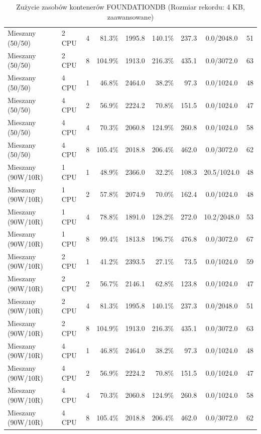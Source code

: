 \begin{table}[ht]
{\begin{tabular}{llcrrrrcc}
Mieszany (50/50) & 2 CPU & 4 & 81.3\% & 1995.8 & 140.1\% & 237.3 & 0.0/2048.0 & 51 \\
Mieszany (50/50) & 2 CPU & 8 & 104.9\% & 1913.0 & 216.3\% & 435.1 & 0.0/3072.0 & 63 \\
Mieszany (50/50) & 4 CPU & 1 & 46.8\% & 2464.0 & 38.2\% & 97.3 & 0.0/1024.0 & 48 \\
Mieszany (50/50) & 4 CPU & 2 & 56.9\% & 2224.2 & 70.8\% & 151.5 & 0.0/1024.0 & 47 \\
Mieszany (50/50) & 4 CPU & 4 & 70.3\% & 2060.8 & 124.9\% & 260.8 & 0.0/1024.0 & 58 \\
Mieszany (50/50) & 4 CPU & 8 & 105.4\% & 2018.8 & 206.4\% & 462.0 & 0.0/3072.0 & 62 \\
Mieszany (90W/10R) & 1 CPU & 1 & 48.9\% & 2366.0 & 32.2\% & 108.3 & 20.5/1024.0 & 48 \\
Mieszany (90W/10R) & 1 CPU & 2 & 57.8\% & 2074.9 & 70.0\% & 162.4 & 0.0/1024.0 & 48 \\
Mieszany (90W/10R) & 1 CPU & 4 & 78.8\% & 1891.0 & 128.2\% & 272.0 & 10.2/2048.0 & 53 \\
Mieszany (90W/10R) & 1 CPU & 8 & 99.4\% & 1813.8 & 196.7\% & 476.8 & 0.0/3072.0 & 67 \\
Mieszany (90W/10R) & 2 CPU & 1 & 41.2\% & 2393.5 & 27.1\% & 73.5 & 0.0/1024.0 & 59 \\
Mieszany (90W/10R) & 2 CPU & 2 & 56.7\% & 2146.1 & 62.8\% & 123.8 & 0.0/1024.0 & 47 \\
Mieszany (90W/10R) & 2 CPU & 4 & 81.3\% & 1995.8 & 140.1\% & 237.3 & 0.0/2048.0 & 51 \\
Mieszany (90W/10R) & 2 CPU & 8 & 104.9\% & 1913.0 & 216.3\% & 435.1 & 0.0/3072.0 & 63 \\
Mieszany (90W/10R) & 4 CPU & 1 & 46.8\% & 2464.0 & 38.2\% & 97.3 & 0.0/1024.0 & 48 \\
Mieszany (90W/10R) & 4 CPU & 2 & 56.9\% & 2224.2 & 70.8\% & 151.5 & 0.0/1024.0 & 47 \\
Mieszany (90W/10R) & 4 CPU & 4 & 70.3\% & 2060.8 & 124.9\% & 260.8 & 0.0/1024.0 & 58 \\
Mieszany (90W/10R) & 4 CPU & 8 & 105.4\% & 2018.8 & 206.4\% & 462.0 & 0.0/3072.0 & 62 \\
\bottomrule
\end{tabular}%
}
\caption{Zużycie zasobów kontenerów FOUNDATIONDB (Rozmiar rekordu: 4 KB, zaawansowane)}
\label{tab:resources_foundationdb_medium_0}
\end{table}
